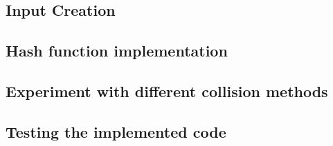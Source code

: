 \subsection{Input Creation}

\subsection{Hash function implementation}

\subsection{Experiment with different collision methods}

\subsection{Testing the implemented code}




  

